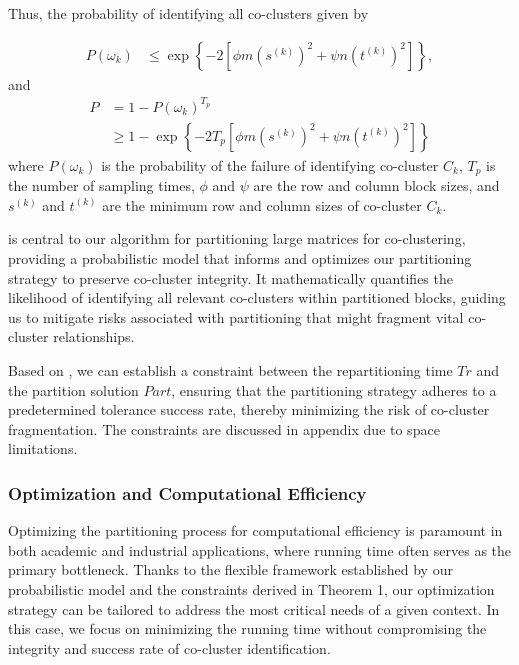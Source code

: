 
Thus, the probability of identifying all co-clusters given by

\begin{align}
    P(\omega_k) & \le \exp \left\{ -2 [\phi m (s^{(k)})^2 + \psi n (t^{(k)})^2] \right\},
\end{align}
and
\begin{align}
    P & = 1 - P(\omega_k)^{T_p}                                                                                                       \\
      & \ge 1 - \exp \left\{ -2 T_p [\phi m (s^{(k)})^2 + \psi n (t^{(k)})^2] \right\} \label{eq:prob_of_identifying_all_co_clusters}
\end{align}
where $P(\omega_k)$ is the probability of the failure of identifying co-cluster $C_k$, $T_p$ is the number of sampling times, $\phi$ and $\psi$ are the row and column block sizes, and $s^{(k)}$ and $t^{(k)}$ are the minimum row and column sizes of co-cluster $C_k$.


 is central to our algorithm for partitioning large matrices for co-clustering, providing a probabilistic model that informs and optimizes our partitioning strategy to preserve co-cluster integrity. It mathematically quantifies the likelihood of identifying all relevant co-clusters within partitioned blocks, guiding us to mitigate risks associated with partitioning that might fragment vital co-cluster relationships.

Based on , we can establish a constraint between the repartitioning time $Tr$ and the partition solution $Part$, ensuring that the partitioning strategy adheres to a predetermined tolerance success rate, thereby minimizing the risk of co-cluster fragmentation. The constraints are discussed in appendix due to space limitations.

\subsubsection{Optimization and Computational Efficiency}
Optimizing the partitioning process for computational efficiency is paramount in both academic and industrial applications, where running time often serves as the primary bottleneck. Thanks to the flexible framework established by our probabilistic model and the constraints derived in Theorem 1, our optimization strategy can be tailored to address the most critical needs of a given context. In this case, we focus on minimizing the running time without compromising the integrity and success rate of co-cluster identification.

